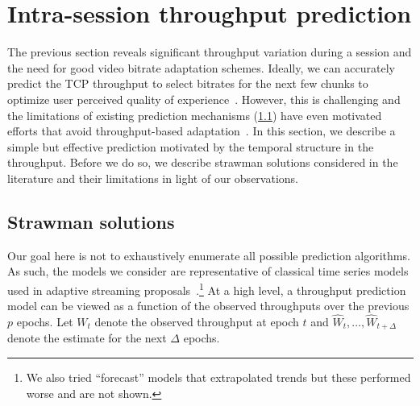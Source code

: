 \section{Intra-session throughput prediction}
\label{sec:premodel}

The previous section reveals  significant throughput variation during a session
and the need for  good video bitrate adaptation schemes.  Ideally, we can
accurately predict the TCP throughput to select bitrates for the next few
chunks to optimize user perceived quality of
experience~\cite{yin2015controlvideo, tian2012towards}. However, this is
challenging and the limitations of existing prediction mechanisms
(\Section\ref{sec:premodel:strawman}) have even motivated efforts that avoid
throughput-based adaptation~\cite{huang2014dash}.  In this section, we describe
a simple but effective prediction motivated by the temporal structure in the
throughput. Before we do so, we describe strawman solutions considered in the
literature and their limitations in light of our observations.


\subsection{Strawman solutions}
\label{sec:premodel:strawman}

Our goal here is not to exhaustively enumerate all possible prediction
algorithms. As such, the models  we consider are representative of classical
time series models used in adaptive streaming
proposals~\cite{yin2015controlvideo, tcppredictability}.\footnote{We also
 tried  ``forecast'' models that extrapolated trends but these
performed worse and are not shown.}  At a high level, a
throughput prediction model can be viewed as a function of the observed
throughputs over the previous  $p$ epochs.  Let $W_t$ denote the  observed
throughput at epoch $t$ and $\hat{W}_t,\ldots,\hat{W}_{t+\Delta}$ denote the
estimate for the next $\Delta$ epochs.

